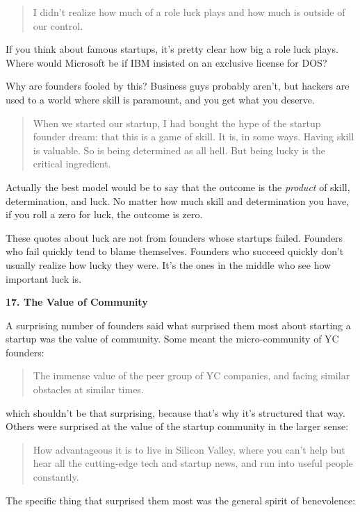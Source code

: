 \documentclass[12pt]{book}
\begin{document}
\begin{quote}
I didn't realize how much of a role luck plays and how much is outside
of our control.
\end{quote}

If you think about famous startups, it's pretty clear how big a role
luck plays. Where would Microsoft be if IBM insisted on an exclusive
license for DOS?

Why are founders fooled by this? Business guys probably aren't, but
hackers are used to a world where skill is paramount, and you get what
you deserve.

\begin{quote}
When we started our startup, I had bought the hype of the startup
founder dream: that this is a game of skill. It is, in some ways. Having
skill is valuable. So is being determined as all hell. But being lucky
is the critical ingredient.
\end{quote}

Actually the best model would be to say that the outcome is the
\emph{product} of skill, determination, and luck. No matter how much
skill and determination you have, if you roll a zero for luck, the
outcome is zero.

These quotes about luck are not from founders whose startups failed.
Founders who fail quickly tend to blame themselves. Founders who succeed
quickly don't usually realize how lucky they were. It's the ones in the
middle who see how important luck is.

\textbf{17. The Value of Community}

A surprising number of founders said what surprised them most about
starting a startup was the value of community. Some meant the
micro-community of YC founders:

\begin{quote}
The immense value of the peer group of YC companies, and facing similar
obstacles at similar times.
\end{quote}

which shouldn't be that surprising, because that's why it's structured
that way. Others were surprised at the value of the startup community in
the larger sense:

\begin{quote}
How advantageous it is to live in Silicon Valley, where you can't help
but hear all the cutting-edge tech and startup news, and run into useful
people constantly.
\end{quote}

The specific thing that surprised them most was the general spirit of
benevolence:
\end{document}
